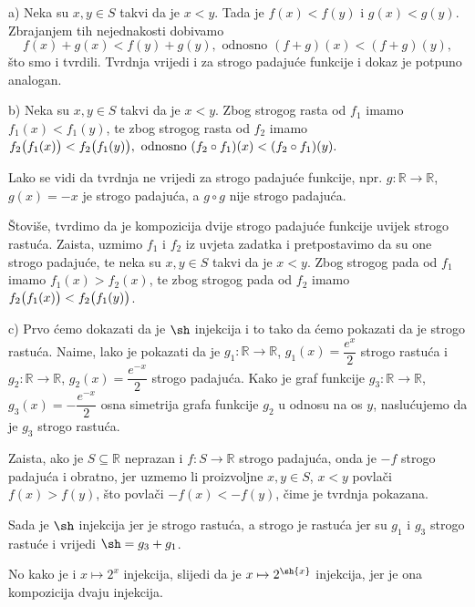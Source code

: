 \documentclass{book}
\let\originalleft\left
\let\originalright\right
\renewcommand{\left}{\mathopen{}\mathclose\bgroup\originalleft}
\renewcommand{\right}{\aftergroup\egroup\originalright}
\renewenvironment{proof}{%
    \vspace{-\parskip}\begin{oldproof}%
    }{%
    \end{oldproof}%
}
\theoremstyle{definition}
\theoremstyle{definition}
\theoremstyle{remark}
\begin{document}
\begin{proof}[Rješenje]
a) Neka su $x, y\in S$ takvi da je $x<y$. Tada je $f(x)<f(y)$ i $g(x)<g(y)$. Zbrajanjem tih nejednakosti dobivamo
$$f(x)+g(x)<f(y)+g(y),\text{ odnosno } (f+g)(x)<(f+g)(y),$$
što smo i tvrdili. Tvrdnja vrijedi i za strogo padajuće funkcije i dokaz je potpuno analogan.

b) Neka su $x, y\in S$ takvi da je $x<y$. Zbog strogog rasta od $f_1$ imamo $f_1(x)<f_1(y)$, te zbog strogog rasta od $f_2$ imamo $f_2\left(f_1(x)\right)<f_2\left(f_1(y)\right),\text{ odnosno } (f_2\circ f_1)(x)<(f_2\circ f_1)(y).$

Lako se vidi da tvrdnja ne vrijedi za strogo padajuće funkcije, npr. $g : \mathbb{R}\to \mathbb{R}$, $g(x)=-x$ je strogo padajuća, a $g\circ g$ nije strogo padajuća. 

Štoviše, tvrdimo da je kompozicija dvije strogo padajuće funkcije uvijek strogo rastuća. Zaista, uzmimo $f_1$ i $f_2$ iz uvjeta zadatka i pretpostavimo da su one strogo padajuće, te neka su $x, y\in S$ takvi da je $x<y$. Zbog strogog pada od $f_1$ imamo $f_1(x)>f_2(x)$, te zbog strogog pada od $f_2$ imamo $f_2\left(f_1(x)\right)<f_2\left(f_1(y)\right)$.

c) Prvo ćemo dokazati da je $\sh$ injekcija i to tako da ćemo pokazati da je strogo rastuća. Naime, lako je pokazati da je $g_1 : \mathbb{R}\to \mathbb{R}$, $g_1(x)=\dfrac{e^x}{2}$ strogo rastuća i $g_2 : \mathbb{R}\to \mathbb{R}$, $g_2(x)=\dfrac{e^{-x}}{2}$ strogo padajuća. Kako je graf funkcije $g_3 : \mathbb{R}\to \mathbb{R}$, $g_3(x)= -\dfrac{e^{-x}}{2}$ osna simetrija grafa funkcije $g_2$ u odnosu na os $y$, naslućujemo da je $g_3$ strogo rastuća.

Zaista, ako je $S\subseteq \mathbb{R}$ neprazan i $f : S\to \mathbb{R}$ strogo padajuća, onda je $-f$ strogo padajuća i obratno, jer uzmemo li proizvoljne $x, y\in S$, $x<y$ povlači $f(x)>f(y)$, što povlači $-f(x)<-f(y)$, čime je tvrdnja pokazana. 

Sada je $\sh$ injekcija jer je strogo rastuća, a strogo je rastuća jer su $g_1$ i $g_3$ strogo rastuće i vrijedi $\sh=g_3+g_1$. 

No kako je i $x\mapsto 2^x$ injekcija, slijedi da je $x\mapsto 2^{\sh{x}}$ injekcija, jer je ona kompozicija dvaju injekcija.
\end{proof}
\end{document}
